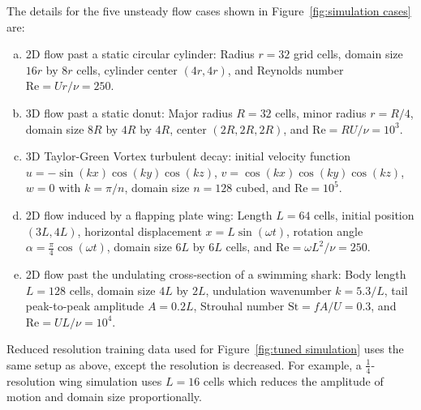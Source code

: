 \documentclass[review]{elsarticle}
\begin{document}
The details for the five unsteady flow cases shown in Figure~\ref{fig:simulation cases} are:
\begin{enumerate}[(a)]
    \item 2D flow past a static circular cylinder: Radius $r=32$ grid cells, domain size $16r$ by $8r$ cells, cylinder center $(4r,4r)$, and Reynolds number $\text{Re}=Ur/\nu=250$.
    \item 3D flow past a static donut: Major radius $R=32$ cells, minor radius $r=R/4$, domain size $8R$ by $4R$ by $4R$, center $(2R,2R,2R)$, and $\text{Re} = RU/\nu=10^3$.
    \item 3D Taylor-Green Vortex turbulent decay: initial velocity function $u=-\sin(kx)\cos(ky)\cos(kz)$, $v=\cos(kx)\cos(ky)\cos(kz)$, $w=0$ with $k=\pi/n$, domain size $n=128$ cubed, and $\text{Re}=10^5$.
    \item 2D flow induced by a flapping plate wing: Length $L=64$ cells, initial position $(3L,4L)$, horizontal displacement $x=L\sin(\omega t)$, rotation angle $\alpha=\frac\pi 4\cos(\omega t)$, domain size $6L$ by $6L$ cells, and $\text{Re}=\omega L^2/\nu=250$.
    \item 2D flow past the undulating cross-section of a swimming shark: Body length $L=128$ cells, domain size $4L$ by $2L$, undulation wavenumber $k=5.3/L$, tail peak-to-peak amplitude $A=0.2L$, Strouhal number $\text{St}=fA/U=0.3$, and $\text{Re}=UL/\nu=10^4$.
\end{enumerate}
Reduced resolution training data used for Figure~\ref{fig:tuned simulation} uses the same setup as above, except the resolution is decreased. For example, a $\frac 14$-resolution wing simulation uses $L=16$ cells which reduces the amplitude of motion and domain size proportionally.
\end{document}
